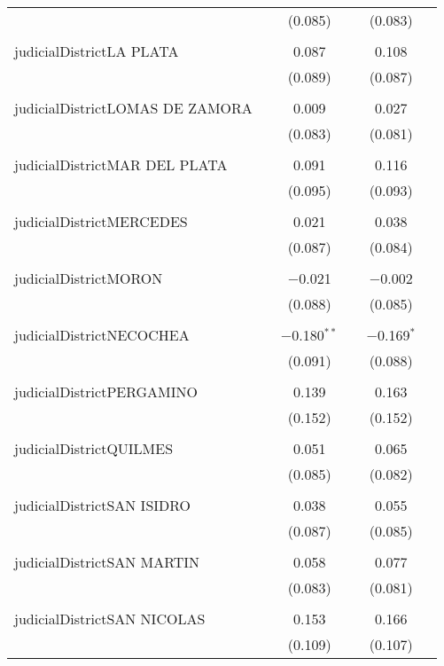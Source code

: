 \begin{table}[!htbp]
\begin{tabular}{@{\extracolsep{5pt}}lccccc}
  &  & (0.085) &  & (0.083) &  \\ 
  & & & & & \\ 
 judicialDistrictLA PLATA &  & 0.087 &  & 0.108 &  \\ 
  &  & (0.089) &  & (0.087) &  \\ 
  & & & & & \\ 
 judicialDistrictLOMAS DE ZAMORA &  & 0.009 &  & 0.027 &  \\ 
  &  & (0.083) &  & (0.081) &  \\ 
  & & & & & \\ 
 judicialDistrictMAR DEL PLATA &  & 0.091 &  & 0.116 &  \\ 
  &  & (0.095) &  & (0.093) &  \\ 
  & & & & & \\ 
 judicialDistrictMERCEDES &  & 0.021 &  & 0.038 &  \\ 
  &  & (0.087) &  & (0.084) &  \\ 
  & & & & & \\ 
 judicialDistrictMORON &  & $-$0.021 &  & $-$0.002 &  \\ 
  &  & (0.088) &  & (0.085) &  \\ 
  & & & & & \\ 
 judicialDistrictNECOCHEA &  & $-$0.180$^{**}$ &  & $-$0.169$^{*}$ &  \\ 
  &  & (0.091) &  & (0.088) &  \\ 
  & & & & & \\ 
 judicialDistrictPERGAMINO &  & 0.139 &  & 0.163 &  \\ 
  &  & (0.152) &  & (0.152) &  \\ 
  & & & & & \\ 
 judicialDistrictQUILMES &  & 0.051 &  & 0.065 &  \\ 
  &  & (0.085) &  & (0.082) &  \\ 
  & & & & & \\ 
 judicialDistrictSAN ISIDRO &  & 0.038 &  & 0.055 &  \\ 
  &  & (0.087) &  & (0.085) &  \\ 
  & & & & & \\ 
 judicialDistrictSAN MARTIN &  & 0.058 &  & 0.077 &  \\ 
  &  & (0.083) &  & (0.081) &  \\ 
  & & & & & \\ 
 judicialDistrictSAN NICOLAS &  & 0.153 &  & 0.166 &  \\ 
  &  & (0.109) &  & (0.107) &  \\ 

\end{tabular}
\end{table}
